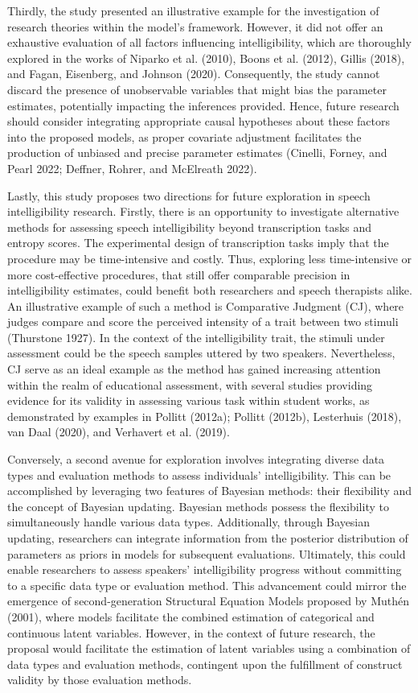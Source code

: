 \documentclass[
sn-apacite
]{sn-jnl}
\begin{document}
Thirdly, the study presented an illustrative example for the
investigation of research theories within the model's framework.
However, it did not offer an exhaustive evaluation of all factors
influencing intelligibility, which are thoroughly explored in the works
of Niparko et al. (2010), Boons et al. (2012), Gillis (2018), and Fagan,
Eisenberg, and Johnson (2020). Consequently, the study cannot discard
the presence of unobservable variables that might bias the parameter
estimates, potentially impacting the inferences provided. Hence, future
research should consider integrating appropriate causal hypotheses about
these factors into the proposed models, as proper covariate adjustment
facilitates the production of unbiased and precise parameter estimates
(Cinelli, Forney, and Pearl 2022; Deffner, Rohrer, and McElreath 2022).

Lastly, this study proposes two directions for future exploration in
speech intelligibility research. Firstly, there is an opportunity to
investigate alternative methods for assessing speech intelligibility
beyond transcription tasks and entropy scores. The experimental design
of transcription tasks imply that the procedure may be time-intensive
and costly. Thus, exploring less time-intensive or more cost-effective
procedures, that still offer comparable precision in intelligibility
estimates, could benefit both researchers and speech therapists alike.
An illustrative example of such a method is Comparative Judgment (CJ),
where judges compare and score the perceived intensity of a trait
between two stimuli (Thurstone 1927). In the context of the
intelligibility trait, the stimuli under assessment could be the speech
samples uttered by two speakers. Nevertheless, CJ serve as an ideal
example as the method has gained increasing attention within the realm
of educational assessment, with several studies providing evidence for
its validity in assessing various task within student works, as
demonstrated by examples in Pollitt (2012a); Pollitt (2012b), Lesterhuis
(2018), van Daal (2020), and Verhavert et al. (2019).

Conversely, a second avenue for exploration involves integrating diverse
data types and evaluation methods to assess individuals'
intelligibility. This can be accomplished by leveraging two features of
Bayesian methods: their flexibility and the concept of Bayesian
updating. Bayesian methods possess the flexibility to simultaneously
handle various data types. Additionally, through Bayesian updating,
researchers can integrate information from the posterior distribution of
parameters as priors in models for subsequent evaluations. Ultimately,
this could enable researchers to assess speakers' intelligibility
progress without committing to a specific data type or evaluation
method. This advancement could mirror the emergence of second-generation
Structural Equation Models proposed by Muthén (2001), where models
facilitate the combined estimation of categorical and continuous latent
variables. However, in the context of future research, the proposal
would facilitate the estimation of latent variables using a combination
of data types and evaluation methods, contingent upon the fulfillment of
construct validity by those evaluation methods.
\end{document}
